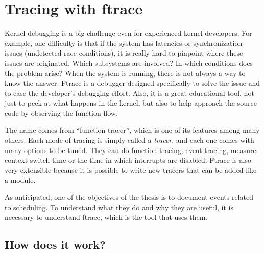 \chapter{Tracing with ftrace}
\label{chap:ftrace}
Kernel debugging is a big challenge even for experienced kernel developers. For example, one difficulty is that if the system has latencies or synchronization issues (undetected race conditions), it is really hard to pinpoint where these issues are originated. Which subsystems are involved? In which conditions does the problem arise? When the system is running, there is not always a way to know the answer. Ftrace is a debugger designed specifically to solve the issue and to ease the developer's debugging effort. Also, it is a great educational tool, not just to peek at what happens in the kernel, but also to help approach the source code by observing the function flow.

The name comes from ``function tracer'', which is one of its features among many others. Each mode of tracing is simply called a \textit{tracer}, and each one comes with many options to be tuned. They can do function tracing, event tracing, measure context switch time or the time in which interrupts are disabled. Ftrace is also very extensible because it is possible to write new tracers that can be added like a module.

As anticipated, one of the objectives of the thesis is to document events related to scheduling. To understand what they do and why they are useful, it is necessary to understand ftrace, which is the tool that uses them.


\section{How does it work?}
\label{sec:how_does_it_work}

